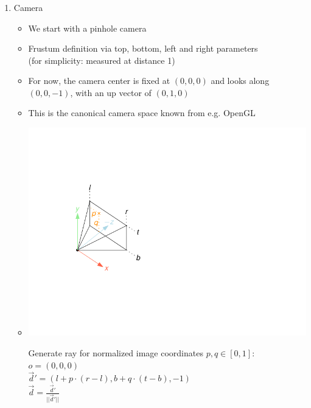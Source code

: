 \documentclass[utf8,stillsansserifmath,fleqn,t]{beamer}
\newcommand{\labelname}[1]{\def\insertenumlabel{#1}\usebeamertemplate{enumerate item}}
\begin{document}
\begin{frame}
\frametitle{\insertsection}
\begin{enumerate}
\item[\labelname{2}] Camera
\begin{itemize}
\item We start with a pinhole camera
\item Frustum definition via top, bottom, left and right parameters\\
    (for simplicity: measured at distance 1)
\item For now, the camera center is fixed at $(0,0,0)$ and looks
along $(0,0,-1)$, with an up vector of $(0,1,0)$
\item This is the canonical camera space known from e.g. OpenGL
\item[~]
    \begin{minipage}{.3\textwidth}
    \includegraphics[width=\textwidth]{./fig/camera.pdf}
    \end{minipage}\hfill
    \begin{minipage}{.5\textwidth}
    Generate ray for normalized image coordinates $p,q \in [0,1]$:\\
    $o = (0,0,0)$\\
    $\vec{d}' = (l + p\cdot (r-l), b + q \cdot(t-b), -1)$\\
    $\vec{d}  = \frac{\vec{d}'}{||\vec{d}'||}$
    \end{minipage}
\end{itemize}
\end{enumerate}
\end{frame}
\end{document}
